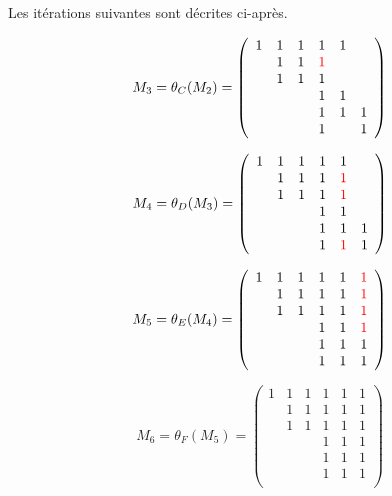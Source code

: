 \documentclass{article}
\begin{document}
Les itérations suivantes sont décrites ci-après.

\begin{equation}
  M_3 = \theta_C(M_2) = \left(
    \begin{array}{cccccc}
      1 & 1 & 1 & 1 & 1 & \\
      & 1 & 1 & {\color{red} 1}&& \\
      & 1 & 1 & 1 && \\
      &&& 1 & 1 & \\
      &&& 1 & 1 & 1 \\
      &&& 1 & & 1 \\
    \end{array}
    \right)
\end{equation}

\begin{equation}
  M_4 = \theta_D(M_3) = \left(
    \begin{array}{cccccc}
      1 & 1 & 1 & 1 & 1 & \\
      & 1 & 1 & {1}& {\color{red} 1}& \\
      & 1 & 1 & 1 & {\color{red} 1} & \\
      &&& 1 & 1 & \\
      &&& 1 & 1 & 1 \\
      &&& 1 & {\color{red} 1} & 1 \\
    \end{array}
    \right)
\end{equation}

\begin{equation}
  M_5 = \theta_E(M_4) = \left(
    \begin{array}{cccccc}
      1 & 1 & 1 & 1 & 1 & {\color{red} 1}\\
      & 1 & 1 & {1}& { 1}& {\color{red} 1}\\
      & 1 & 1 & 1 & { 1} & {\color{red} 1}\\
      &&& 1 & 1 & {\color{red} 1}\\
      &&& 1 & 1 & 1 \\
      &&& 1 & { 1} & 1 \\
    \end{array}
    \right)
\end{equation}

\begin{equation}
  M_6 = \theta_F(M_5) = \left(
    \begin{array}{cccccc}
      1 & 1 & 1 & 1 & 1 & { 1}\\
      & 1 & 1 & {1}& { 1}& { 1}\\
      & 1 & 1 & 1 & { 1} & { 1}\\
      &&& 1 & 1 & { 1}\\
      &&& 1 & 1 & 1 \\
      &&& 1 & { 1} & 1 \\
    \end{array}
    \right)
\end{equation}
\end{document}
